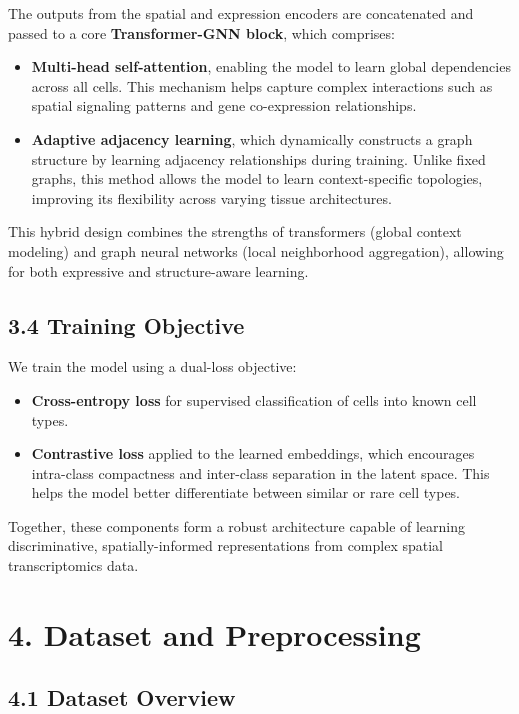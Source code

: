 \documentclass[unnumsec,webpdf,contemporary,medium]{oup-authoring-template}
\begin{document}
The outputs from the spatial and expression encoders are concatenated and passed to a core \textbf{Transformer-GNN block}, which comprises:
\begin{itemize}
    \item \textbf{Multi-head self-attention}, enabling the model to learn global dependencies across all cells. This mechanism helps capture complex interactions such as spatial signaling patterns and gene co-expression relationships.
    \item \textbf{Adaptive adjacency learning}, which dynamically constructs a graph structure by learning adjacency relationships during training. Unlike fixed graphs, this method allows the model to learn context-specific topologies, improving its flexibility across varying tissue architectures.
\end{itemize}

This hybrid design combines the strengths of transformers (global context modeling) and graph neural networks (local neighborhood aggregation), allowing for both expressive and structure-aware learning.

\subsection{3.4 Training Objective}

We train the model using a dual-loss objective:
\begin{itemize}
    \item \textbf{Cross-entropy loss} for supervised classification of cells into known cell types.
    \item \textbf{Contrastive loss} applied to the learned embeddings, which encourages intra-class compactness and inter-class separation in the latent space. This helps the model better differentiate between similar or rare cell types.
\end{itemize}

Together, these components form a robust architecture capable of learning discriminative, spatially-informed representations from complex spatial transcriptomics data.

\section{4. Dataset and Preprocessing}

\subsection{4.1 Dataset Overview}
\end{document}
